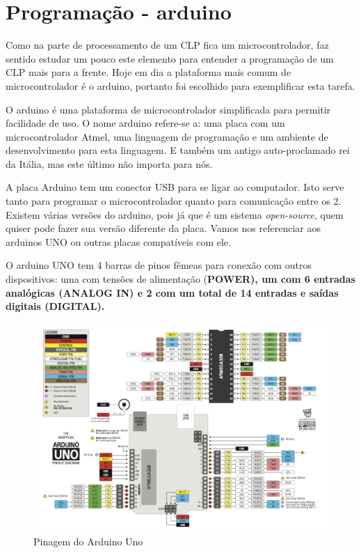 \chapter{Programação - arduino}

Como na parte de processamento de um CLP fica um microcontrolador, faz sentido estudar um pouco este elemento para entender a programação de um CLP mais para a frente. Hoje em dia a plataforma mais comum de microcontrolador é o arduino, portanto foi escolhido para exemplificar esta tarefa.

O arduino é uma plataforma de microcontrolador simplificada para permitir facilidade de uso. O nome arduino refere-se a: uma placa com um microcontrolador Atmel, uma linguagem de programação e um ambiente de desenvolvimento para esta linguagem. E também um antigo auto-proclamado rei da Itália, mas este último não importa para nós.

A placa Arduino tem um conector USB para se ligar ao computador. Isto serve tanto para programar o microcontrolador quanto para comunicação entre os 2. Existem várias versões do arduino, pois já que é um sistema \emph{open-source}, quem quiser pode fazer sua versão diferente da placa. Vamos nos referenciar aos arduinos UNO ou outras placas compatíveis com ele.

O arduino UNO tem 4 barras de pinos fêmeas para conexão com outros dispositivos: uma com tensões de alimentação (\bfseries{POWER}), um com 6 entradas analógicas (\bfseries{ANALOG IN}) e 2 com um total de 14 entradas e saídas digitais (\bfseries{DIGITAL}).
\begin{figure}[hbt]
	\centering
	\includegraphics[width=\textwidth]{figuras/Arduino-Uno-Pinout}
	\caption{Pinagem do Arduino Uno}
	\label{fig:pinagem-arduino-uno}
\end{figure}

